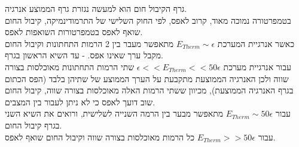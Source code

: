 \documentclass{article}
\begin{document}
\begin{Answer}
גרף הקיבול חום הוא למעשה נגזרת גרף הממוצע אנרגיה.\\
בטמפרטורה נמוכה מאוד, קרוב לאפס, לפי החוק השלישי של התרמודינמיקה, קיבול החום שואף לאפס בטמפרטורות השואפות לאפס.\\
כאשר אנרגיית המערכת $E_{Therm}\sim \epsilon$ מתאפשר מעבר בין 2 הרמות התחתונות וקיבול החום מקבל ערך שאינו אפס. - עד השיא הראשון בגרף.\\
עבור אנרגיית מערכת $\epsilon<<E_{Therm}<<50\epsilon$ שתי הרמות התחתונות מאוכלסות בצורה שווה ולכן האנרגיה הממוצעת מתקבעת על הערך הממוצע של שתיהן בלבד (הפס הכתום בגרף האנרגיה הממוצעת), מכיוון ששתי הרמות האלה מאוכלסות בצורה שווה, קיבול החום שוב דועך לאפס כי לא ניתן לעבור בין המצבים.\\
עבור $E_{Therm}\sim 50\epsilon$ מתאפשר מבער בין הרמה השנייה לשלישית, ורואים את השיא השני בגרף קיבול החום.\\
עבור $E_{Therm}>> 50\epsilon$ כל הרמות מאוכלסות בצורה שווה וקיבול החום שואף לאפס.
\end{Answer}
\end{document}
